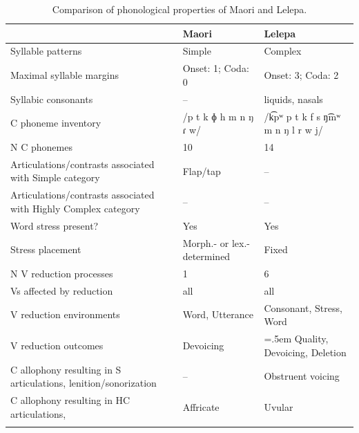 \begin{table}
\small
\begin{tabularx}{\textwidth}{IQQ}
\lsptoprule
 & {Maori} & {Lelepa}\\
 \midrule 
 {Syllable patterns} & Simple & Complex\\
\tablevspace
 {Maximal syllable margins} & Onset: 1; Coda: 0 & Onset: 3; Coda: 2\\
\tablevspace
 {Syllabic consonants} & -- & liquids, nasals\\
\tablevspace
 {C phoneme inventory} & /p t k ɸ h m n ŋ ɾ w/ & /k͡pʷ p t k f s ŋ͡mʷ m n ŋ l r w j/\\
\tablevspace
 {N C phonemes} & 10 & 14\\
\tablevspace
 {Articulations/contrasts associated with {Simple}} {category} & {Flap/tap} & {--}\\
\tablevspace
 {Articulations/contrasts associated with {Highly Complex}} {category} & {--} & {--}\\
\tablevspace
 {Word stress present?} & {Yes} & {Yes}\\
\tablevspace
 {Stress placement} & {Morph.- or lex.-determined} & {Fixed}\\
\tablevspace
 {N V reduction processes} & {1} & {6}\\
\tablevspace
 {Vs affected by reduction}  & {all} & {all}\\
\tablevspace
 {V reduction environments} & {Word, Utterance} & {Consonant, Stress, Word}\\
\tablevspace
 {V reduction outcomes} & {Devoicing} & \hangindent=.5em Quality, Devoicing, Deletion\\
\tablevspace
 {C allophony resulting in S articulations, lenition/sonorization} & {--} & { {Obstruent voicing}}\\
\tablevspace
{ {C allophony resulting in HC articulations,} } & { {Affricate}} & {Uvular}\\
\lspbottomrule
\end{tabularx}
\caption{\label{tab:8.7}Comparison of phonological properties of Maori and Lelepa.}
\end{table}

